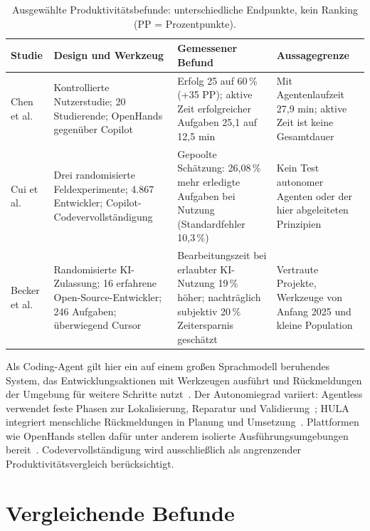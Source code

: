 \documentclass[conference]{IEEEtran}
\begin{document}
\begin{table}[!t]
\caption{Ausgewählte Produktivitätsbefunde: unterschiedliche Endpunkte, kein Ranking (PP = Prozentpunkte).}
\label{tab:produktivitaet}
\centering
\small
\setlength{\tabcolsep}{4pt}
\begin{tabular}{@{}L{0.13\textwidth}L{0.27\textwidth}L{0.31\textwidth}L{0.23\textwidth}@{}}
\hline
\textbf{Studie} & \textbf{Design und Werkzeug} & \textbf{Gemessener Befund} & \textbf{Aussagegrenze}\\
\hline
Chen et al.~\cite{chen2025codewithme} & Kontrollierte Nutzerstudie; 20 Studierende; OpenHands gegenüber Copilot & Erfolg 25 auf 60\,\% (+35 PP); aktive Zeit erfolgreicher Aufgaben 25,1 auf 12,5 min & Mit Agentenlaufzeit 27,9 min; aktive Zeit ist keine Gesamtdauer\\[3pt]
Cui et al.~\cite{cui2025genai} & Drei randomisierte Feldexperimente; 4.867 Entwickler; Copilot-Codevervollständigung & Gepoolte Schätzung: 26,08\,\% mehr erledigte Aufgaben bei Nutzung (Standardfehler 10,3\,\%) & Kein Test autonomer Agenten oder der hier abgeleiteten Prinzipien\\[3pt]
Becker et al.~\cite{becker2025metr} & Randomisierte KI-Zulassung; 16 erfahrene Open-Source-Entwickler; 246 Aufgaben; überwiegend Cursor & Bearbeitungszeit bei erlaubter KI-Nutzung 19\,\% höher; nachträglich subjektiv 20\,\% Zeitersparnis geschätzt & Vertraute Projekte, Werkzeuge von Anfang 2025 und kleine Population\\
\hline
\end{tabular}
\end{table}

Als Coding-Agent gilt hier ein auf einem großen Sprachmodell beruhendes System, das Entwicklungsaktionen mit Werkzeugen ausführt und Rückmeldungen der Umgebung für weitere Schritte nutzt~\cite{liu2024agentsurvey}. Der Autonomiegrad variiert: Agentless verwendet feste Phasen zur Lokalisierung, Reparatur und Validierung~\cite{xia2025agentless}; HULA integriert menschliche Rückmeldungen in Planung und Umsetzung~\cite{takerngsaksiri2025hula}. Plattformen wie OpenHands stellen dafür unter anderem isolierte Ausführungsumgebungen bereit~\cite{wang2025openhands}. Codevervollständigung wird ausschließlich als angrenzender Produktivitätsvergleich berücksichtigt.

\section{Vergleichende Befunde}
\end{document}
